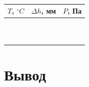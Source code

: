 \documentclass[a4paper,12pt]{article} %
\begin{document}
\begin{table}[h]
  \caption{}
  \begin{tabular}{|c|c|c|}
      \hline $T$, $^\circ C$  &  $\Delta h$, мм & $P$, Па \\
      \hline  &  &  \\
      \hline  &  &  \\
      \hline  &  &  \\
      \hline  &  &  \\
      \hline  &  &  \\
      \hline  &  &  \\
      \hline  &  &  \\
      \hline  &  &  \\
      \hline  &  &  \\
      \hline  &  &  \\
      \hline 
  \end{tabular}
  \label{tab:}
\end{table}

\section*{Вывод}
\end{document}
